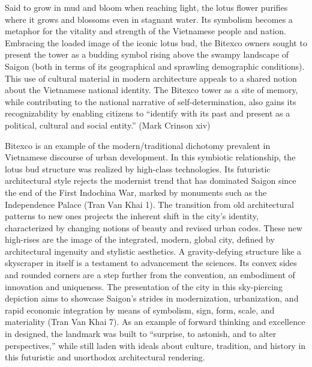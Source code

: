 Said to grow in mud and bloom when reaching light, the lotus flower purifies where it grows and blossoms even in stagnant water. Its symbolism becomes a metaphor for the vitality and strength of the Vietnamese people and nation. Embracing the loaded image of the iconic lotus bud, the Bitexco owners sought to present the tower as a budding symbol rising above the swampy landscape of Saigon (both in terms of its geographical and sprawling demographic conditions). This use of cultural material in modern architecture appeals to a shared notion about the Vietnamese national identity. The Bitexco tower as a site of memory, while contributing to the national narrative of self-determination, also gains its recognizability by enabling citizens to “identify with its past and present as a political, cultural and social entity.” (Mark Crinson xiv) 

Bitexco is an example of the modern/traditional dichotomy prevalent in Vietnamese discourse of urban development. In this symbiotic relationship, the lotus bud structure was realized by high-class technologies. Its futuristic architectural style rejects the modernist trend that has dominated Saigon since the end of the First Indochina War, marked by monuments such as the Independence Palace (Tran Van Khai 1). The transition from old architectural patterns to new ones projects the inherent shift in the city’s identity, characterized by changing notions of beauty and revised urban codes. These new high-rises are the image of the integrated, modern, global city, defined by architectural ingenuity and stylistic aesthetics. A gravity-defying structure like a skyscraper in itself is a testament to advancement the sciences. Its convex sides and rounded corners are a step further from the convention, an embodiment of innovation and uniqueness. The presentation of the city in this sky-piercing depiction aims to showcase Saigon’s strides in modernization, urbanization, and rapid economic integration by means of symbolism, sign, form, scale, and materiality (Tran Van Khai 7). As an example of forward thinking and excellence in designed, the landmark was built to “surprise, to astonish, and to alter perspectives,” while still laden with ideals about culture, tradition, and history in this futuristic and unorthodox architectural rendering. 


